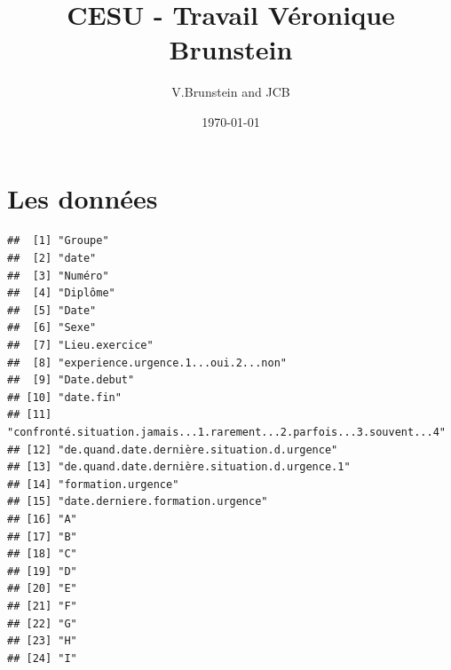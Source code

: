 \documentclass[12pt,english,french]{article}\usepackage{graphicx, color}
\makeatletter
\newenvironment{kframe}{%
 \def\at@end@of@kframe{}%
 \ifinner\ifhmode%
  \def\at@end@of@kframe{\end{minipage}}%
  \begin{minipage}{\columnwidth}%
 \fi\fi%
 \def\FrameCommand##1{\hskip\@totalleftmargin \hskip-\fboxsep
 \colorbox{shadecolor}{##1}\hskip-\fboxsep
     \hskip-\linewidth \hskip-\@totalleftmargin \hskip\columnwidth}%
 \MakeFramed {\advance\hsize-\width
   \@totalleftmargin\z@ \linewidth\hsize
   \@setminipage}}%
 {\par\unskip\endMakeFramed%
 \at@end@of@kframe}
\newenvironment{knitrout}{}{} %
\makeatother
\begin{document}
\title{CESU - Travail Véronique Brunstein}
\author{V.Brunstein and JCB}
\date{\today}
\maketitle

\section{Les données}

\begin{knitrout}
\color{fgcolor}\begin{kframe}
\begin{verbatim}
##  [1] "Groupe"                                                             
##  [2] "date"                                                               
##  [3] "Numéro"                                                             
##  [4] "Diplôme"                                                            
##  [5] "Date"                                                               
##  [6] "Sexe"                                                               
##  [7] "Lieu.exercice"                                                      
##  [8] "experience.urgence.1...oui.2...non"                                 
##  [9] "Date.debut"                                                         
## [10] "date.fin"                                                           
## [11] "confronté.situation.jamais...1.rarement...2.parfois...3.souvent...4"
## [12] "de.quand.date.dernière.situation.d.urgence"                         
## [13] "de.quand.date.dernière.situation.d.urgence.1"                       
## [14] "formation.urgence"                                                  
## [15] "date.derniere.formation.urgence"                                    
## [16] "A"                                                                  
## [17] "B"                                                                  
## [18] "C"                                                                  
## [19] "D"                                                                  
## [20] "E"                                                                  
## [21] "F"                                                                  
## [22] "G"                                                                  
## [23] "H"                                                                  
## [24] "I"                                                                  

\end{verbatim}
\end{kframe}
\end{knitrout}
\end{document}
